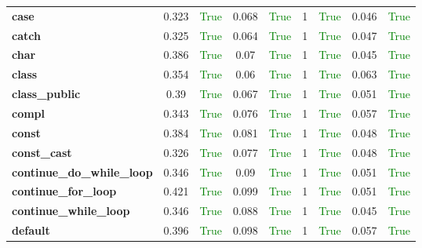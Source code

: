 \documentclass{article}
\begin{document}
\begin{xltabular}{\textwidth}{lcccccccc}
\textbf{{\fontsize{10}{12}\selectfont case}}& 0.323&\textcolor{green}{True}& 0.068&\textcolor{green}{True}& 1&\textcolor{green}{True}& 0.046&\textcolor{green}{True} \\[0.5ex]
\textbf{{\fontsize{10}{12}\selectfont catch}}& 0.325&\textcolor{green}{True}& 0.064&\textcolor{green}{True}& 1&\textcolor{green}{True}& 0.047&\textcolor{green}{True} \\[0.5ex]
\textbf{{\fontsize{10}{12}\selectfont char}}& 0.386&\textcolor{green}{True}& 0.07&\textcolor{green}{True}& 1&\textcolor{green}{True}& 0.045&\textcolor{green}{True} \\[0.5ex]
\textbf{{\fontsize{10}{12}\selectfont class}}& 0.354&\textcolor{green}{True}& 0.06&\textcolor{green}{True}& 1&\textcolor{green}{True}& 0.063&\textcolor{green}{True} \\[0.5ex]
\textbf{{\fontsize{10}{12}\selectfont class\_public}}& 0.39&\textcolor{green}{True}& 0.067&\textcolor{green}{True}& 1&\textcolor{green}{True}& 0.051&\textcolor{green}{True} \\[0.5ex]
\textbf{{\fontsize{10}{12}\selectfont compl}}& 0.343&\textcolor{green}{True}& 0.076&\textcolor{green}{True}& 1&\textcolor{green}{True}& 0.057&\textcolor{green}{True} \\[0.5ex]
\textbf{{\fontsize{10}{12}\selectfont const}}& 0.384&\textcolor{green}{True}& 0.081&\textcolor{green}{True}& 1&\textcolor{green}{True}& 0.048&\textcolor{green}{True} \\[0.5ex]
\textbf{{\fontsize{10}{12}\selectfont const\_cast}}& 0.326&\textcolor{green}{True}& 0.077&\textcolor{green}{True}& 1&\textcolor{green}{True}& 0.048&\textcolor{green}{True} \\[0.5ex]
\textbf{{\fontsize{10}{12}\selectfont continue\_do\_while\_loop}}& 0.346&\textcolor{green}{True}& 0.09&\textcolor{green}{True}& 1&\textcolor{green}{True}& 0.051&\textcolor{green}{True} \\[0.5ex]
\textbf{{\fontsize{10}{12}\selectfont continue\_for\_loop}}& 0.421&\textcolor{green}{True}& 0.099&\textcolor{green}{True}& 1&\textcolor{green}{True}& 0.051&\textcolor{green}{True} \\[0.5ex]
\textbf{{\fontsize{10}{12}\selectfont continue\_while\_loop}}& 0.346&\textcolor{green}{True}& 0.088&\textcolor{green}{True}& 1&\textcolor{green}{True}& 0.045&\textcolor{green}{True} \\[0.5ex]
\textbf{{\fontsize{10}{12}\selectfont default}}& 0.396&\textcolor{green}{True}& 0.098&\textcolor{green}{True}& 1&\textcolor{green}{True}& 0.057&\textcolor{green}{True} \\[0.5ex]

\end{xltabular}
\end{document}

